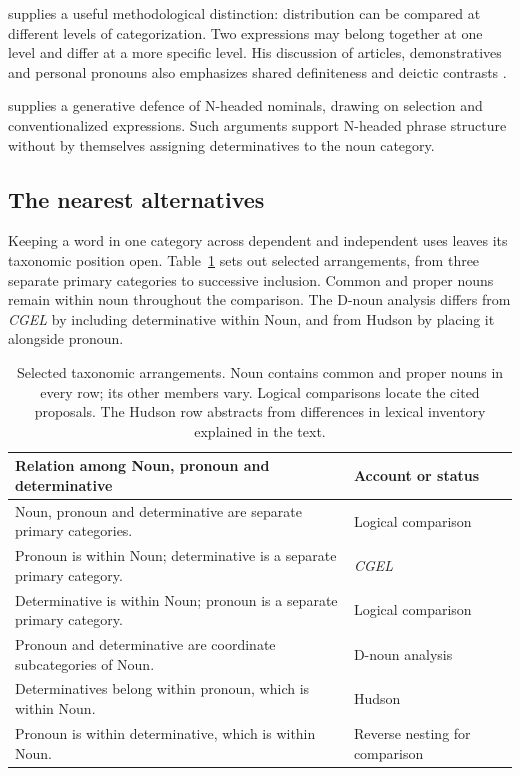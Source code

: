 \documentclass[12pt]{article}
\begin{document}
\textcite[232--235]{lyons1968} supplies a useful methodological distinction: distribution can be compared at different levels of categorization. Two expressions may belong together at one level and differ at a more specific level. His discussion of articles, demonstratives and personal pronouns also emphasizes shared definiteness and deictic contrasts \citep[279]{lyons1968}.

\textcite{bruening2020nominal} supplies a generative defence of N-headed nominals, drawing on selection and conventionalized expressions. Such arguments support N-headed phrase structure without by themselves assigning determinatives to the noun category.

\subsection{The nearest alternatives}

Keeping a word in one category across dependent and independent uses leaves its taxonomic position open. Table~\ref{tab:rivals} sets out selected arrangements, from three separate primary categories to successive inclusion. Common and proper nouns remain within noun throughout the comparison. The D-noun analysis differs from \textit{CGEL} by including determinative within Noun, and from Hudson by placing it alongside pronoun.

\begin{table}[tb]
\centering\small
\caption{Selected taxonomic arrangements. Noun contains common and proper nouns in every row; its other members vary. Logical comparisons locate the cited proposals. The Hudson row abstracts from differences in lexical inventory explained in the text.}\label{tab:rivals}
\begin{tabular}{>{\raggedright\arraybackslash}p{8.7cm}>{\raggedright\arraybackslash}p{3cm}}
\toprule
Relation among Noun, pronoun and determinative & Account or status \\
\midrule
Noun, pronoun and determinative are separate primary categories. & Logical comparison \\
Pronoun is within Noun; determinative is a separate primary category. & \textit{CGEL} \\
Determinative is within Noun; pronoun is a separate primary category. & Logical comparison \\
Pronoun and determinative are coordinate subcategories of Noun. & D-noun analysis \\
Determinatives belong within pronoun, which is within Noun. & Hudson \\
Pronoun is within determinative, which is within Noun. & Reverse nesting for comparison \\
\bottomrule
\end{tabular}
\end{table}
\end{document}
